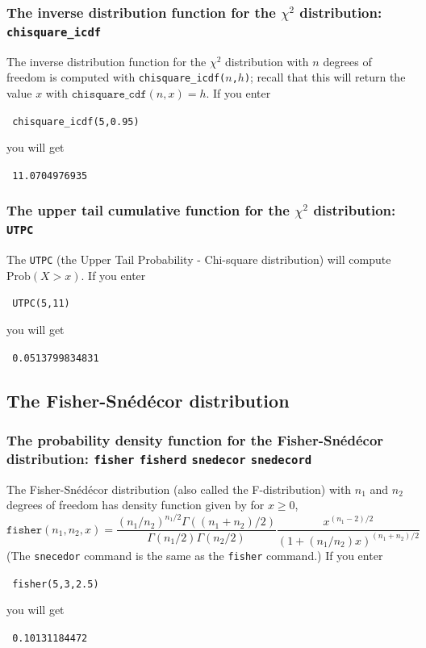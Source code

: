 \documentclass[a4paper,11pt]{book}
\begin{document}
\subsubsection{The inverse distribution function for the $\chi^2$
distribution: \texttt{chisquare\_icdf}}

The inverse distribution function for the $\chi^2$
distribution with $n$ degrees of freedom is computed with
\texttt{chisquare\_icdf($n$,$h$)}; recall that this will return the
value $x$ with $\texttt{chisquare\_cdf}(n,x) = h$.  If you enter
\begin{center}
  \tt
  chisquare\_icdf(5,0.95)
\end{center}
you will get
\begin{center}
  \tt
  11.0704976935
\end{center}

\subsubsection{The upper tail cumulative function for the $\chi^2$
distribution: \texttt{UTPC}}

The \texttt{UTPC} (the Upper Tail Probability - Chi-square distribution) will compute
$\text{Prob}(X > x)$.  
If you enter
\begin{center}
  \tt
  UTPC(5,11)
\end{center}
you will get
\begin{center}
  \tt
  0.0513799834831
\end{center}

\subsection{The Fisher-Sn\'{e}d\'{e}cor distribution}

\subsubsection{The probability density function for the Fisher-Sn\'{e}d\'{e}cor distribution: \texttt{fisher} \texttt{fisherd} \texttt{snedecor} \texttt{snedecord}}

The Fisher-Sn\'{e}d\'{e}cor distribution (also called the F-distribution)
with $n_1$ and $n_2$ degrees of freedom has density function given by
for $x \ge 0$,
\[
\texttt{fisher}(n_1,n_2,x) =
\frac{(n_1/n_2)^{n_1/2}\Gamma((n_1+n_2)/2)}{\Gamma(n_1/2)\Gamma(n_2/2)}
\frac{x^{(n_1-2)/2}}{(1+(n_1/n_2)x)^{(n_1+n_2)/2}}
\]
(The \texttt{snecedor} command is the same as the \texttt{fisher}
command.)
If you enter
\begin{center}
  \tt
  fisher(5,3,2.5)
\end{center}
you will get
\begin{center}
  \tt
  0.10131184472
\end{center}
\end{document}
